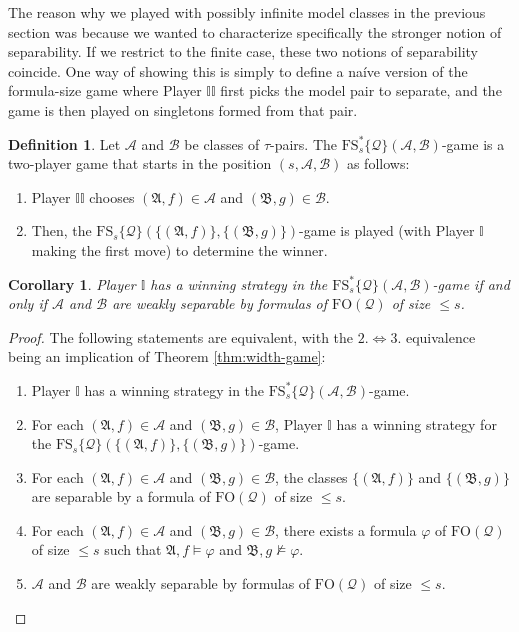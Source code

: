 \documentclass{article}
\newtheorem{corollary}[theorem]{Corollary}
\theoremstyle{definition}
\newtheorem{definition}[theorem]{Definition}
\begin{document}
The reason why we played with possibly infinite model classes in the previous section was because we wanted to characterize specifically the stronger notion of separability. If we restrict to the finite case, these two notions of separability coincide. One way of showing this is simply to define a naíve version of the formula-size game where Player $\mathbb{II}$ first picks the model pair to separate, and the game is then played on singletons formed from that pair.
\begin{definition}\label{weak_game}
    Let $\mathcal{A}$ and $\mathcal{B}$ be classes of $\tau$-pairs. The $\mathrm{FS}^*_{s}\{\mathcal{Q}\}(\mathcal{A},\mathcal{B})$-game is a two-player game that starts in the position $(s,\mathcal{A},\mathcal{B})$ as follows:
    \begin{enumerate}
        \item Player $\mathbb{I}\mathbb{I}$ chooses $(\mathfrak{A},f)\in\mathcal{A}$ and $(\mathfrak{B},g)\in  \mathcal{B}$.
        \item Then, the $\mathrm{FS}_s\{\mathcal{Q}\}(\{(\mathfrak{A},f)\},\{(\mathfrak{B},g)\})$-game is played (with Player $\mathbb{I}$ making the first move) to determine the winner.
    \end{enumerate}
\end{definition}

\begin{corollary}\label{cor:weak-game}
    Player $\mathbb{I}$ has a winning strategy in the $\mathrm{FS}^*_s\{\mathcal{Q}\}(\mathcal{A},\mathcal{B})$-game if and only if $\mathcal{A}$ and $\mathcal{B}$ are weakly separable by formulas of $\mathrm{FO}(\mathcal{Q})$ of size $\leq s$.
\end{corollary}
\begin{proof}
    The following statements are equivalent, with the $2.\iff 3.$ equivalence being an implication of Theorem \ref{thm:width-game}:
    \begin{enumerate}
        \item Player $\mathbb{I}$ has a winning strategy in the $\mathrm{FS}^*_s\{\mathcal{Q}\}(\mathcal{A},\mathcal{B})$-game.
        \item For each $(\mathfrak{A},f)\in \mathcal{A}$ and $(\mathfrak{B},g)\in \mathcal{B}$, Player $\mathbb{I}$ has a winning strategy for the $\mathrm{FS}_s\{\mathcal{Q}\}(\{(\mathfrak{A},f)\},\{(\mathfrak{B},g)\})$-game.
        \item For each $(\mathfrak{A},f)\in \mathcal{A}$ and $(\mathfrak{B},g)\in \mathcal{B}$, the classes $\{(\mathfrak{A},f)\}$ and $\{(\mathfrak{B},g)\}$ are separable by a formula of $\mathrm{FO}(\mathcal{Q})$ of size $\leq s$.
        \item For each $(\mathfrak{A},f)\in \mathcal{A}$ and $(\mathfrak{B},g)\in \mathcal{B}$, there exists a formula $\varphi$ of $\mathrm{FO}(\mathcal{Q})$ of size $\leq s$ such that $\mathfrak{A},f\models\varphi$ and $\mathfrak{B},g\not\models\varphi$.
        \item $\mathcal{A}$ and $\mathcal{B}$ are weakly separable by formulas of $\mathrm{FO}(\mathcal{Q})$ of size $\leq s$.\qedhere
    \end{enumerate}
\end{proof}
\end{document}

